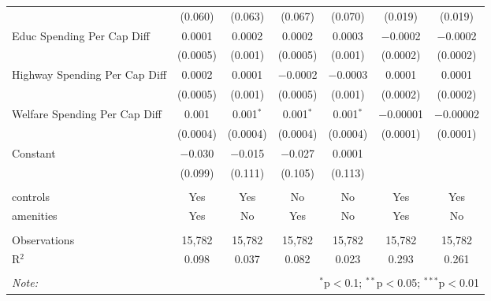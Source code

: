 \begin{table}[!htbp]
\begin{tabular}{@{\extracolsep{5pt}}lcccccc}
  & (0.060) & (0.063) & (0.067) & (0.070) & (0.019) & (0.019) \\ 
  Educ Spending Per Cap Diff & 0.0001 & 0.0002 & 0.0002 & 0.0003 & $-$0.0002 & $-$0.0002 \\ 
  & (0.0005) & (0.001) & (0.0005) & (0.001) & (0.0002) & (0.0002) \\ 
  Highway Spending Per Cap Diff & 0.0002 & 0.0001 & $-$0.0002 & $-$0.0003 & 0.0001 & 0.0001 \\ 
  & (0.0005) & (0.001) & (0.0005) & (0.001) & (0.0002) & (0.0002) \\ 
  Welfare Spending Per Cap Diff & 0.001 & 0.001$^{*}$ & 0.001$^{*}$ & 0.001$^{*}$ & $-$0.00001 & $-$0.00002 \\ 
  & (0.0004) & (0.0004) & (0.0004) & (0.0004) & (0.0001) & (0.0001) \\ 
  Constant & $-$0.030 & $-$0.015 & $-$0.027 & 0.0001 &  &  \\ 
  & (0.099) & (0.111) & (0.105) & (0.113) &  &  \\ 
 \hline \\[-1.8ex] 
controls & Yes & Yes & No & No & Yes & Yes \\ 
amenities & Yes & No & Yes & No & Yes & No \\ 
\hline \\[-1.8ex] 
Observations & 15,782 & 15,782 & 15,782 & 15,782 & 15,782 & 15,782 \\ 
R$^{2}$ & 0.098 & 0.037 & 0.082 & 0.023 & 0.293 & 0.261 \\ 
\hline 
\hline \\[-1.8ex] 
\textit{Note:}  & \multicolumn{6}{r}{$^{*}$p$<$0.1; $^{**}$p$<$0.05; $^{***}$p$<$0.01} \\ 
\end{tabular} 
\end{table} 
